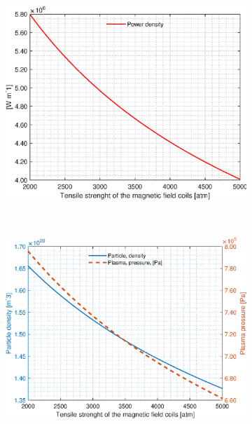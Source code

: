 \begin{figure}[H]
	\begin{subfigure}[h!]{.45\textwidth}
		\includegraphics[width=\textwidth]{MatlabFigures/sigmamax/f5.eps}
	\end{subfigure}
	~
	\begin{subfigure}[h!]{.45\textwidth}
		\includegraphics[width=\textwidth]{MatlabFigures/sigmamax/f6.eps}
	\end{subfigure}


\end{figure}

